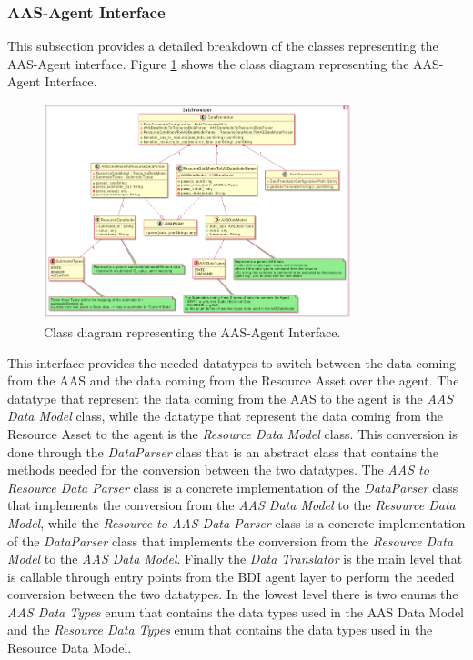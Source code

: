 \subsubsection{AAS-Agent Interface}
This subsection provides a detailed breakdown of the classes representing the AAS-Agent interface.
Figure \ref{fig:aas_agent_interface_classes} shows the class diagram representing the AAS-Agent Interface.
\begin{figure}[ht]
    \centering
    \includegraphics[width=0.8\textwidth]{Images/Classes_Resource/DataTranslator.png}
    \caption{Class diagram representing the AAS-Agent Interface.}
    \label{fig:aas_agent_interface_classes}
\end{figure}

This interface provides the needed datatypes to switch between the data coming from the AAS and the data coming from the Resource Asset over the agent.
The datatype that represent the data coming from the AAS to the agent is the \emph{AAS Data Model} class, while the datatype that represent the data coming from the Resource Asset to the agent is the \emph{Resource Data Model} class.
This conversion is done through the \emph{DataParser} class that is an abstract class that contains the methods needed for the conversion between the two datatypes.
The \emph{AAS to Resource Data Parser} class is a concrete implementation of the \emph{DataParser} class that implements the conversion from the \emph{AAS Data Model} to the \emph{Resource Data Model}, while the \emph{Resource to AAS Data Parser} class is a concrete implementation of the \emph{DataParser} class that implements the conversion from the \emph{Resource Data Model} to the \emph{AAS Data Model}.
Finally the \emph{Data Translator} is the main level that is callable through entry points from the BDI agent layer to perform the needed conversion between the two datatypes.
In the lowest level there is two enums  the \emph{AAS Data Types} enum that contains the data types used in the AAS Data Model and the \emph{Resource Data Types} enum that contains the data types used in the Resource Data Model.

